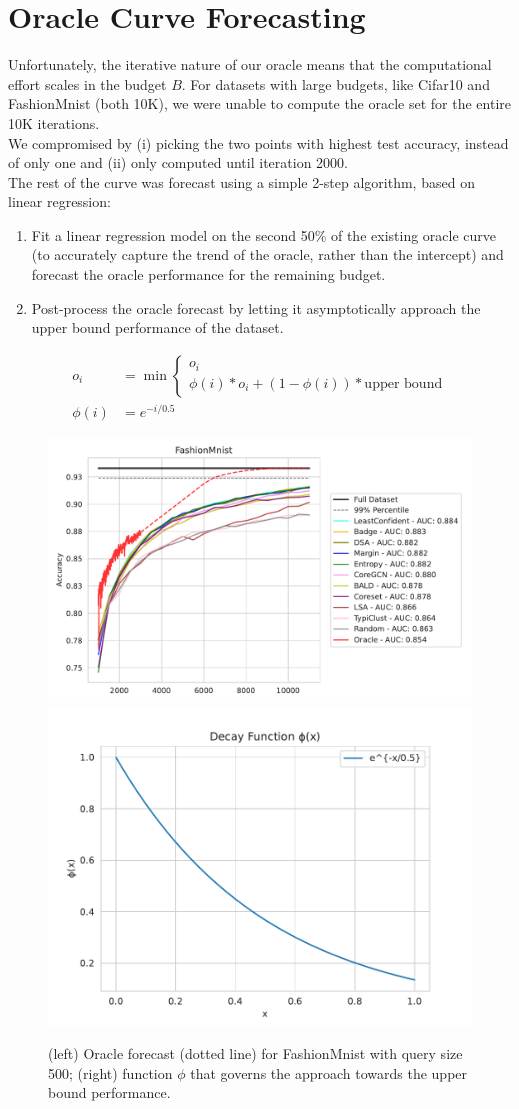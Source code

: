 \documentclass[]{article}
\begin{document}
\section{Oracle Curve Forecasting}\label{app:oracle_forecasting}
Unfortunately, the iterative nature of our oracle means that the computational effort scales in the budget $B$.
For datasets with large budgets, like Cifar10 and FashionMnist (both 10K), we were unable to compute the oracle set for the entire 10K iterations. \\
We compromised by (i) picking the two points with highest test accuracy, instead of only one and (ii) only computed until iteration 2000. \\
The rest of the curve was forecast using a simple 2-step algorithm, based on linear regression:
\begin{enumerate}
	\item Fit a linear regression model on the second 50\% of the existing oracle curve (to accurately capture the trend of the oracle, rather than the intercept) and forecast the oracle performance for the remaining budget.
	\item Post-process the oracle forecast by letting it asymptotically approach the upper bound performance of the dataset.
\end{enumerate}
\begin{align}
	o_i &= \operatorname{min} \begin{cases} 
		o_i \\
		\phi(i) * o_i + (1 - \phi(i)) * \text{upper bound} 
	\end{cases} \\
	\phi(i) &= e^{-i / 0.5}
\end{align}
\begin{figure}[H]
	\centering
	\caption{(left) Oracle forecast (dotted line) for FashionMnist with query size 500; (right) function $\phi$ that governs the approach towards the upper bound performance.}
	\includegraphics[width=0.55\linewidth]{img/eval_fmnist_500.pdf}
	\includegraphics[width=0.43\linewidth]{img/phi_example.pdf}
\end{figure}
\end{document}
